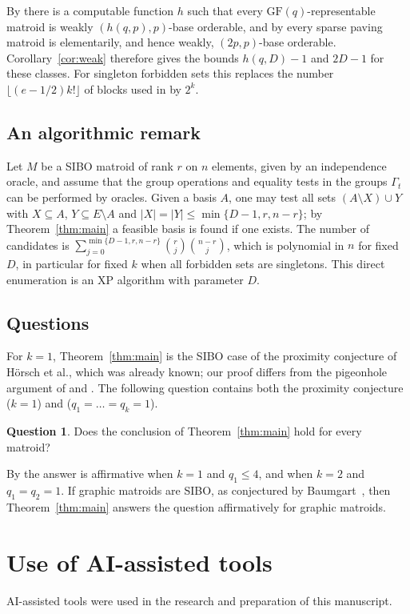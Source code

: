 \documentclass{amsart}
\theoremstyle{definition}
\newtheorem{question}[theorem]{Question}
\theoremstyle{remark}
\begin{document}
By \cite[Theorem~5.6]{GMOSY} there is a computable function $h$ such that every $\mathrm{GF}(q)$-representable matroid is weakly $(h(q,p),p)$-base orderable, and by \cite[Remark~5.10]{GMOSY} every sparse paving matroid is elementarily, and hence weakly, $(2p,p)$-base orderable. Corollary~\ref{cor:weak} therefore gives the bounds $h(q,D)-1$ and $2D-1$ for these classes. For singleton forbidden sets this replaces the number $\lfloor(e-1/2)k!\rfloor$ of blocks used in \cite[Corollary~5.11]{GMOSY} by $2^k$.

\subsection{An algorithmic remark}
Let $M$ be a SIBO matroid of rank $r$ on $n$ elements, given by an independence oracle, and assume that the group operations and equality tests in the groups $\Gamma_t$ can be performed by oracles. Given a basis $A$, one may test all sets $(A\setminus X)\cup Y$ with $X\subseteq A$, $Y\subseteq E\setminus A$ and $|X|=|Y|\le\min\{D-1,r,n-r\}$; by Theorem~\ref{thm:main} a feasible basis is found if one exists. The number of candidates is $\sum_{j=0}^{\min\{D-1,r,n-r\}}\binom{r}{j}\binom{n-r}{j}$, which is polynomial in $n$ for fixed $D$, in particular for fixed $k$ when all forbidden sets are singletons. This direct enumeration is an XP algorithm with parameter $D$.

\subsection{Questions}
For $k=1$, Theorem~\ref{thm:main} is the SIBO case of the proximity conjecture of H\"orsch et al., which was already known; our proof differs from the pigeonhole argument of \cite[Remark~5.16]{HIMOS-full} and \cite[Lemma~2.4]{GMOSY}. The following question contains both the proximity conjecture ($k=1$) and \cite[Question~6.2]{GMOSY} ($q_1=\dots=q_k=1$).

\begin{question}
Does the conclusion of Theorem~\ref{thm:main} hold for every matroid?
\end{question}

By \cite[Theorem~4.4 and Theorem~5.5]{GMOSY} the answer is affirmative when $k=1$ and $q_1\le4$, and when $k=2$ and $q_1=q_2=1$. If graphic matroids are SIBO, as conjectured by Baumgart~\cite{Baumgart}, then Theorem~\ref{thm:main} answers the question affirmatively for graphic matroids.

\section*{Use of AI-assisted tools}
AI-assisted tools were used in the research and preparation of this manuscript.
\end{document}
